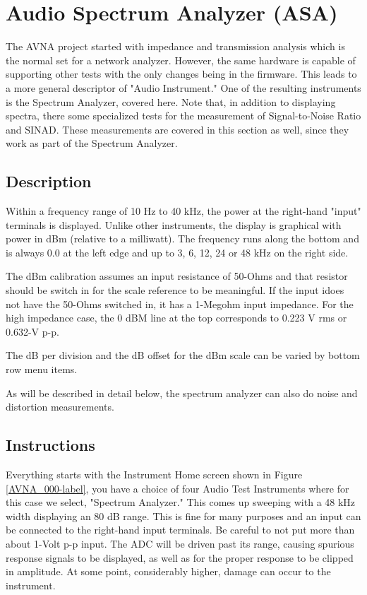 \section{Audio Spectrum Analyzer (ASA)}
\label{sect:ASA}
The AVNA project started with impedance and transmission analysis which is the normal set for a network analyzer.  However, the same hardware is capable of supporting other tests with the only changes being in the firmware.  This leads to a more general descriptor of "Audio Instrument."  One of the resulting instruments is the Spectrum Analyzer, covered here.  Note that, in addition to displaying spectra,  there some specialized tests for the measurement of Signal-to-Noise Ratio and SINAD.  These measurements are covered in this section as well, since they work as part of the Spectrum Analyzer.
\subsection{Description}
\label{subsect:ASADescr}
Within a frequency range of 10 Hz to 40 kHz, the power at the right-hand "input" terminals is displayed.  Unlike other instruments, the display is graphical with power in dBm (relative to a milliwatt).  The frequency runs along the bottom and is always 0.0 at the left edge and up to 3, 6, 12, 24 or 48 kHz on the right side. 

The dBm calibration assumes an input resistance of 50-Ohms and that resistor should be switch in for the scale reference to be meaningful.  If the input idoes not have the 50-Ohms switched in, it has a 1-Megohm input impedance.  For the high impedance case, the 0 dBM line at the top corresponds to 0.223 V rms or 0.632-V p-p.

The dB per division and the dB offset for the dBm scale can be varied by bottom row menu items.

As will be described in detail below, the spectrum analyzer can also do noise and  distortion measurements.

\subsection{Instructions}
\label{subsect:ASAInstr}
Everything starts with the Instrument Home screen shown in  Figure \ref{AVNA_000-label},  you have a choice of four Audio Test Instruments where for this case we select, "Spectrum Analyzer."  This comes up sweeping with a 48 kHz width displaying an 80 dB range.   This is fine for many purposes and an input can be connected to the right-hand input terminals.  Be careful to not put more than about 1-Volt p-p input.  The ADC will be driven past its range, causing spurious response signals to be displayed, as well as for the proper response to be clipped in amplitude.  At some point, considerably higher, damage can occur to the instrument.

